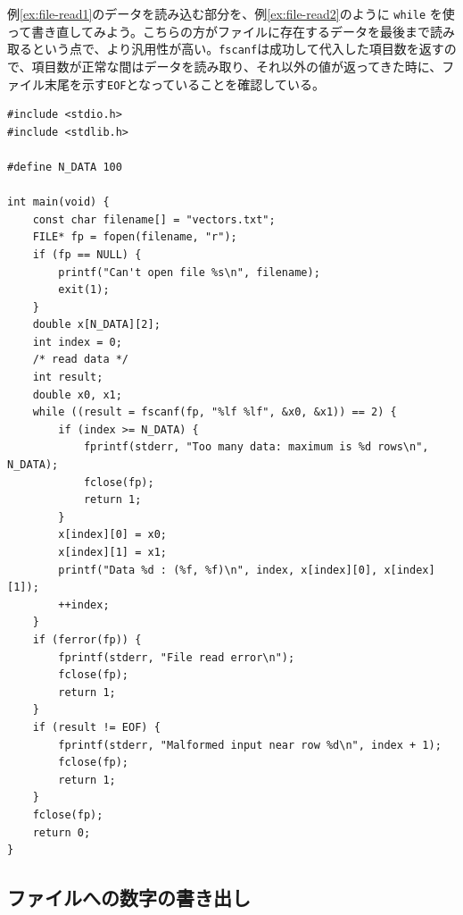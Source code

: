 例\ref{ex:file-read1}のデータを読み込む部分を、例\ref{ex:file-read2}のように \texttt{while} を使って書き直してみよう。こちらの方がファイルに存在するデータを最後まで読み取るという点で、より汎用性が高い。\texttt{fscanf}は成功して代入した項目数を返すので、項目数が正常な間はデータを読み取り、それ以外の値が返ってきた時に、ファイル末尾を示す\texttt{EOF}となっていることを確認している。
\begin{reidai}\label{ex:file-read2}
    \begin{verbatim}
#include <stdio.h>
#include <stdlib.h>

#define N_DATA 100

int main(void) {
    const char filename[] = "vectors.txt";
    FILE* fp = fopen(filename, "r");
    if (fp == NULL) {
        printf("Can't open file %s\n", filename);
        exit(1);
    }
    double x[N_DATA][2];
    int index = 0;
    /* read data */
    int result;
    double x0, x1;
    while ((result = fscanf(fp, "%lf %lf", &x0, &x1)) == 2) {
        if (index >= N_DATA) {
            fprintf(stderr, "Too many data: maximum is %d rows\n", N_DATA);
            fclose(fp);
            return 1;
        }
        x[index][0] = x0;
        x[index][1] = x1;
        printf("Data %d : (%f, %f)\n", index, x[index][0], x[index][1]);
        ++index;
    }
    if (ferror(fp)) {
        fprintf(stderr, "File read error\n");
        fclose(fp);
        return 1;
    }
    if (result != EOF) {
        fprintf(stderr, "Malformed input near row %d\n", index + 1);
        fclose(fp);
        return 1;
    }
    fclose(fp);
    return 0;
}
\end{verbatim}
\end{reidai}

\subsection{ファイルへの数字の書き出し}

